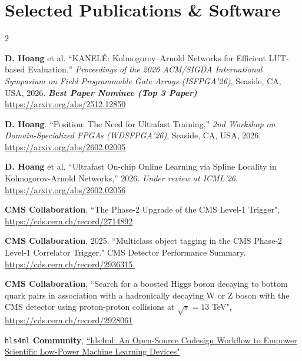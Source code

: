 \documentclass[a4paper,11pt]{article}
\begin{document}
\section*{\textbf{Selected Publications \& Software}}
\vspace{0.2mm}
\small{
\begin{multicols}{2}
\begin{enumerate}[leftmargin=*, labelsep=0.5em, align=left, widest={[\textbf{S.1}]}, itemindent=0em, label={\textbf{[\arabic*]}}]

\item \textbf{D. Hoang} et al. ``KANEL\'{E}: Kolmogorov--Arnold Networks for Efficient LUT-based Evaluation,'' 
\emph{Proceedings of the 2026 ACM/SIGDA International Symposium on Field Programmable Gate Arrays (ISFPGA'26)}, 
Seaside, CA, USA, 2026. 
\textbf{\emph{Best Paper Nominee (Top 3 Paper)}}
\url{https://arxiv.org/abs/2512.12850}

\item \textbf{D. Hoang}. ``Position: The Need for Ultrafast Training,'' 
\emph{2nd Workshop on Domain-Specialized FPGAs (WDSFPGA'26)}, 
Seaside, CA, USA, 2026. 
\url{https://arxiv.org/abs/2602.02005}

\item \textbf{D. Hoang} et al. ``Ultrafast On-chip Online Learning via Spline Locality in Kolmogorov-Arnold Networks,'' 
2026. \emph{Under review at ICML'26}. 
\url{https://arxiv.org/abs/2602.02056}


\item \textbf{CMS Collaboration}, ``The Phase-2 Upgrade of the CMS Level-1 Trigger", \url{https://cds.cern.ch/record/2714892}

\item \textbf{CMS Collaboration}, 2025. ``Multiclass object tagging in the CMS Phase-2 Level-1 Correlator Trigger." CMS Detector Performance Summary. \url{https://cds.cern.ch/record/2936315.}
\newpage

\item \textbf{CMS Collaboration}, ``Search for a boosted Higgs boson decaying to bottom quark pairs in association with a hadronically decaying W or Z boson with the CMS detector using proton-proton collisions at $\sqrt{s}=13$ TeV", \url{https://cds.cern.ch/record/2928061}

\item \texttt{hls4ml} \textbf{Community}, \href{[arXiv:2103.05579 [cs.LG]].}{``hls4ml: An Open-Source Codesign Workflow to Empower Scientific Low-Power Machine Learning Devices"}



\end{enumerate}
\end{multicols}}
\end{document}
